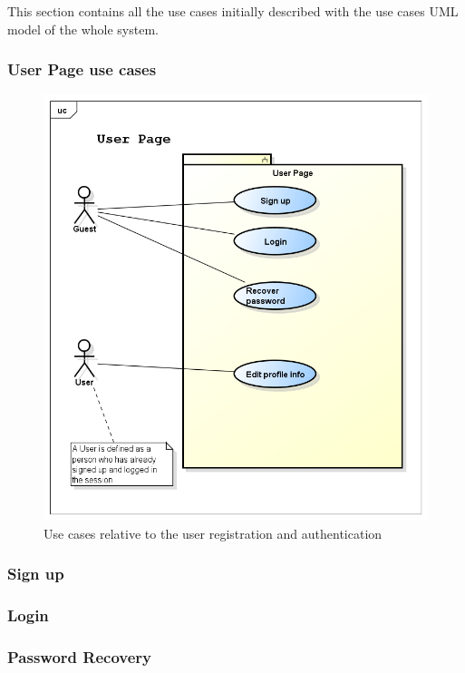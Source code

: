 This section contains all the use cases initially described with the use cases UML model of the whole system.

\subsubsection{User Page use cases}
\begin{figure}[htp] 

\includegraphics[width=\textwidth]{usecases/png/userpage} 
\caption{Use cases relative to the user registration and authentication} 
\label{fig:userpage} 
\end{figure} 

\newpage
\subsubsection{Sign up}


 \newpage
\subsubsection{Login}

\newpage
\subsubsection{Password Recovery}



